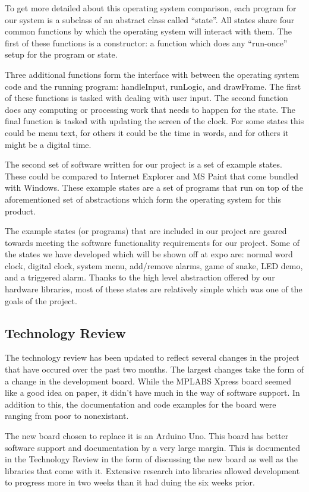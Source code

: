 \documentclass[onecolumn, draftclsnofoot,10pt, compsoc]{IEEEtran}
\begin{document}
To get more detailed about this operating system comparison, each program for our system is a subclass of an abstract class called “state”.
All states share four common functions by which the operating system will interact with them.
The first of these functions is a constructor: a function which does any “run-once” setup for the program or state.

Three additional functions form the interface with between the operating system code and the running program: handleInput, runLogic, and drawFrame.
The first of these functions is tasked with dealing with user input.
The second function does any computing or processing work that needs to happen for the state.
The final function is tasked with updating the screen of the clock.
For some states this could be menu text, for others it could be the time in words, and for others it might be a digital time.

The second set of software written for our project is a set of example states.
These could be compared to Internet Explorer and MS Paint that come bundled with Windows.
These example states are a set of programs that run on top of the aforementioned set of abstractions which form the operating system for this product.

The example states (or programs) that are included in our project are geared towards meeting the software functionality requirements for our project.
Some of the states we have developed which will be shown off at expo are: normal word clock, digital clock, system menu, add/remove alarms, game of snake,  LED demo, and a triggered alarm.
Thanks to the high level abstraction offered by our hardware libraries, most of these states are relatively simple which was one of the goals of the project.

\subsection{Technology Review}
The technology review has been updated to reflect several changes in the project that have occured over the past two months.
The largest changes take the form of a change in the development board.
While the MPLABS Xpress board seemed like a good idea on paper, it didn't have much in the way of software support.
In addition to this, the documentation and code examples for the board were ranging from poor to nonexistant.

The new board chosen to replace it is an Arduino Uno.
This board has better software support and documentation by a very large margin.
This is documented in the Technology Review in the form of discussing the new board as well as the libraries that come with it.
Extensive research into libraries allowed development to progress more in two weeks than it had duing the six weeks prior.
\end{document}
